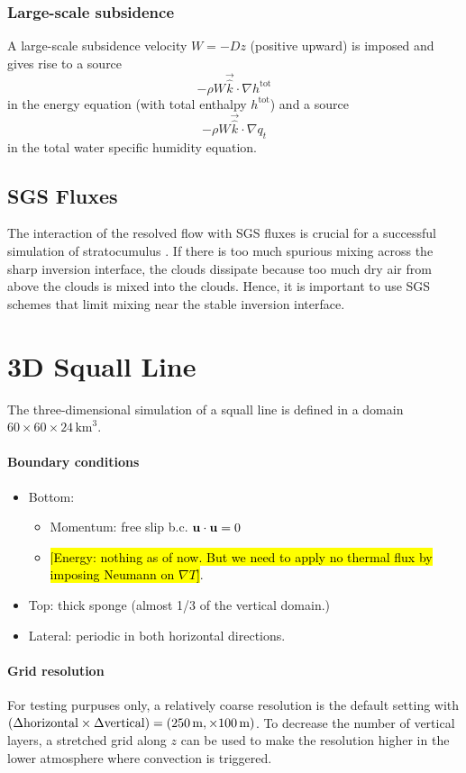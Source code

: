 \documentclass{report}
\begin{document}
\subsubsection{Large-scale subsidence}

A large-scale subsidence velocity $W=-Dz$ (positive upward) is imposed and gives rise to a source
\[
-\rho W \vec{\hat k} \cdot \nabla h^\mathrm{tot}
\]
in the energy equation (with total enthalpy $h^\mathrm{tot}$) and a source
\[
-\rho W \vec{\hat k} \cdot \nabla q_t
\]
in the total water specific humidity equation.

\subsection{SGS Fluxes}

The interaction of the resolved flow with SGS fluxes is crucial for a successful simulation of stratocumulus \citep{Pressel17a}. If there is too much spurious mixing across the sharp inversion interface, the clouds dissipate because too much dry air from above the clouds is mixed into the clouds. Hence, it is important to use SGS schemes that limit mixing near the stable inversion interface.

\section{3D Squall Line}
\label{sq3D}
The three-dimensional simulation of a squall line is defined in a domain
$60\times 60\times24\,\mathrm{km}^3$. 

\paragraph{Boundary conditions}
\begin{itemize}
\item Bottom:
    \begin{itemize}
        \item Momentum: free slip b.c. ${\bf u}\cdot{\bf u}= 0$
        \item \hl{[Energy: nothing as of now. But we need to apply no thermal flux by imposing Neumann on $\nabla T$]}.
    \end{itemize}
\item Top: thick sponge (almost 1/3 of the vertical domain.)
\item Lateral: periodic in both horizontal directions.
\end{itemize}

\paragraph{Grid resolution} For testing purpuses only, a relatively coarse resolution is the default setting with $(\Delta {\rm horizontal}\times \Delta {\rm vertical}) = (250\,{\rm m}, \times 100\,{\rm m})$. To decrease the number of vertical layers, a stretched grid along $z$ can be used to make the resolution higher in the lower atmosphere where convection is triggered. 
\end{document}
